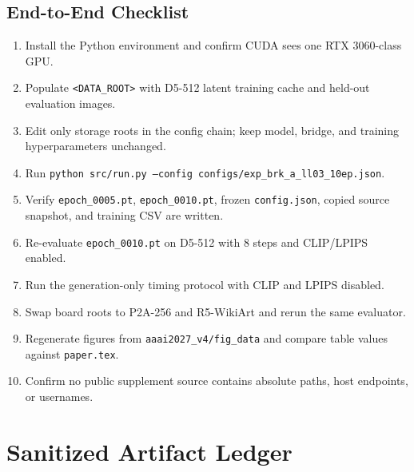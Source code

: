 \documentclass[10pt,twocolumn]{article}
\begin{document}
\subsection{End-to-End Checklist}

\begin{enumerate}[leftmargin=1.6em,itemsep=0.2em]
  \item Install the Python environment and confirm CUDA sees one RTX 3060-class GPU.
  \item Populate \texttt{<DATA\_ROOT>} with D5-512 latent training cache and held-out
  evaluation images.
  \item Edit only storage roots in the config chain; keep model, bridge, and training
  hyperparameters unchanged.
  \item Run \texttt{python src/run.py --config configs/exp\_brk\_a\_ll03\_10ep.json}.
  \item Verify \texttt{epoch\_0005.pt}, \texttt{epoch\_0010.pt}, frozen
  \texttt{config.json}, copied source snapshot, and training CSV are written.
  \item Re-evaluate \texttt{epoch\_0010.pt} on D5-512 with 8 steps and CLIP/LPIPS
  enabled.
  \item Run the generation-only timing protocol with CLIP and LPIPS disabled.
  \item Swap board roots to P2A-256 and R5-WikiArt and rerun the same evaluator.
  \item Regenerate figures from \texttt{aaai2027\_v4/fig\_data} and compare table values
  against \texttt{paper.tex}.
  \item Confirm no public supplement source contains absolute paths, host endpoints, or
  usernames.
\end{enumerate}

\section{Sanitized Artifact Ledger}
\end{document}
